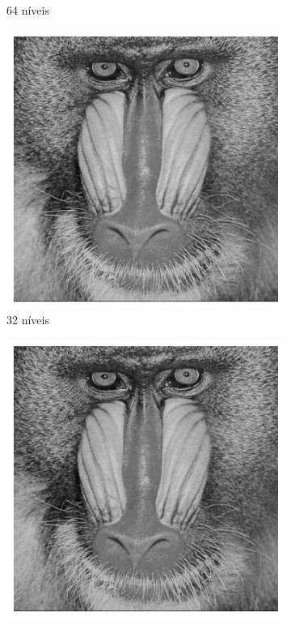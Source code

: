 \documentclass[12pt,a4paper]{report}
\begin{document}
\begin{figure}[H]
\begin{subfigure}{0.3\textwidth}
    \caption{64 níveis}
  \end{subfigure}
  \begin{subfigure}{0.3\textwidth}
    \includegraphics[width=\linewidth]{imagens/ex9-3.png}
    \caption{32 níveis}
  \end{subfigure}
  \begin{subfigure}{0.3\textwidth}
    \includegraphics[width=\linewidth]{imagens/ex9-4.png}

\end{subfigure}
\end{figure}
\end{document}
